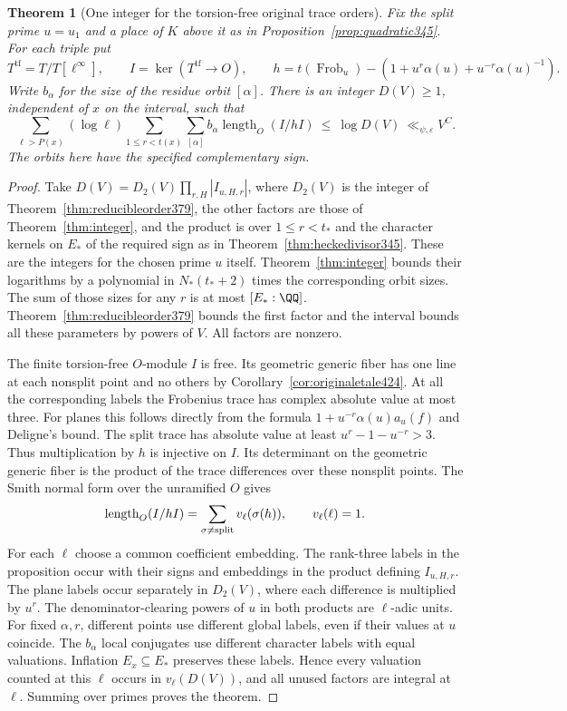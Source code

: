 \documentclass[a4paper,11pt]{article}
\newtheorem{theorem}[proposition]{Theorem}
\theoremstyle{definition}
\theoremstyle{remark}
\numberwithin{equation}{section}
\begin{document}
\begin{theorem}[One integer for the torsion-free original trace orders]\leavevmode
\label{thm:originalorder424}
Fix the split prime \(u=u_1\) and a place of \(K\) above it
as in Proposition~\ref{prop:quadratic345}. For each triple put
\[
 T^{\mathrm{tf}}=T/T[\ell^\infty],\qquad
 I=\ker(T^{\mathrm{tf}}\longrightarrow O),\qquad
 h=t(\operatorname{Frob}_u)-
       (1+u^r\alpha(u)+u^{-r}\alpha(u)^{-1}).
\]
Write \(b_\alpha\) for the size of the residue orbit
\([\alpha]\). There is an integer \(D(V)\ge1\), independent of
\(x\) on the interval, such that
\[
 \sum_{\ell>P(x)}(\log\ell)
    \sum_{1\le r<t(x)}\sum_{[\alpha]} b_\alpha
            \operatorname{length}_O(I/hI)
       \ \le\ \log D(V)\ \ll_{\psi,\varepsilon} V^C.
\]
The orbits here have the specified complementary sign.
\end{theorem}
\begin{proof}
Take \(D(V)=D_2(V)\prod_{r,H}|I_{u,H,r}|\), where \(D_2(V)\)
is the integer of Theorem~\ref{thm:reducibleorder379}, the
other factors are those of Theorem~\ref{thm:integer}, and the
product is over \(1\le r<t_*\) and the character kernels on
\(E_*\) of the required sign as in Theorem~\ref{thm:heckedivisor345}.
These are the integers for the chosen prime \(u\) itself.
Theorem~\ref{thm:integer} bounds their logarithms by a
polynomial in \(N_*(t_*+2)\) times the corresponding orbit
sizes. The sum of those sizes for any \(r\) is at most
\([E_*:\QQ]\). Theorem~\ref{thm:reducibleorder379} bounds the
first factor and the interval bounds all these parameters by
powers of \(V\). All factors are nonzero.

The finite torsion-free \(O\)-module \(I\) is free. Its geometric
generic fiber has one line at each nonsplit point and no others
by Corollary~\ref{cor:originaletale424}. At all the corresponding
labels the Frobenius trace has complex absolute value at most
three. For planes this follows directly from the formula
\(1+u^{-r}\alpha(u)a_u(f)\) and Deligne's bound.
The split trace has absolute value at least \(u^r-1-u^{-r}>3\).
Thus multiplication by \(h\) is injective on \(I\). Its
determinant on the geometric generic fiber is the product
of the trace differences over these nonsplit points. The
Smith normal form over the unramified \(O\) gives
\[
 \operatorname{length}_O(I/hI)
       =\sum_{\sigma\ne{\rm split}} v_\ell(\sigma(h)),
                  \qquad v_\ell(\ell)=1 .
\]
For each \(\ell\) choose a common coefficient embedding.
The rank-three labels in the proposition occur with their signs
and embeddings in the product defining \(I_{u,H,r}\). The
plane labels occur separately in \(D_2(V)\), where each
difference is multiplied by \(u^r\). The denominator-clearing
powers of \(u\) in both products are \(\ell\)-adic units.
For fixed \(\alpha,r\), different points use different global
labels, even if their values at \(u\) coincide. The \(b_\alpha\)
local conjugates use different character labels with equal
valuations. Inflation \(E_x\subseteq E_*\) preserves these
labels. Hence every valuation counted at this \(\ell\) occurs
in \(v_\ell(D(V))\), and all unused factors are integral at \(\ell\).
Summing over primes proves the theorem.
\end{proof}
\end{document}

